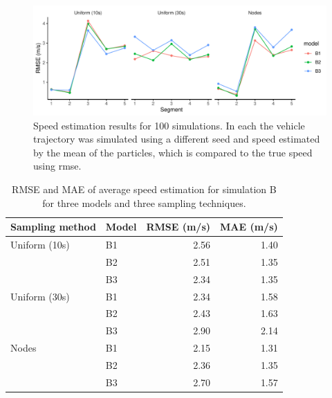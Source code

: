 \begin{knitrout}\small
{}\color{fgcolor}\begin{figure}
\includegraphics[width=\maxwidth]{figure/sim2_pf_full-1} \caption[Results for simulation B replicated 100~times]{Speed estimation results for 100 simulations. In each the vehicle trajectory was simulated using a different seed and speed estimated by the mean of the particles, which is compared to the true speed using \gls{rmse}.}\label{fig:sim2_pf_full}
\end{figure}

\begin{table}

\caption{\label{tab:sim2_pf_full}RMSE and MAE of average speed estimation for simulation B for three models and three sampling techniques.}
\centering
\fontsize{8}{10}\selectfont
\begin{tabular}[t]{llrr}
\toprule
Sampling method & Model & RMSE (m/s) & MAE (m/s)\\
\midrule
Uniform (10s) & B1 & 2.56 & 1.40\\
 & B2 & 2.51 & 1.35\\
 & B3 & 2.34 & 1.35\\
\midrule
Uniform (30s) & B1 & 2.34 & 1.58\\
 & B2 & 2.43 & 1.63\\
 & B3 & 2.90 & 2.14\\
\midrule
Nodes & B1 & 2.15 & 1.31\\
 & B2 & 2.36 & 1.35\\
 & B3 & 2.70 & 1.57\\
\bottomrule
\end{tabular}
\end{table}


\end{knitrout}







